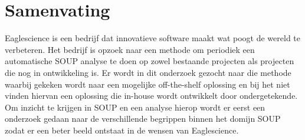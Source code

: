 


\begingroup
\let\clearpage\relax
\let\cleardoublepage\relax
\let\cleardoublepage\relax

\chapter*{Samenvating}
Eaglescience is een bedrijf dat innovatieve software maakt wat poogt de wereld te verbeteren. Het bedrijf is opzoek naar een methode om periodiek een automatische SOUP analyse te doen op zowel bestaande projecten als projecten die nog in ontwikkeling is. Er wordt in dit onderzoek gezocht naar die methode waarbij gekeken wordt naar een mogelijke off-the-shelf oplossing en bij het niet vinden hiervan een oplossing die in-house wordt ontwikkelt door ondergetekende. \\
Om inzicht te krijgen in SOUP en een analyse hierop wordt er eerst een onderzoek gedaan naar de verschillende begrippen binnen het domijn SOUP zodat er een beter beeld ontstaat in de wensen van Eaglescience. 

\endgroup			

\vfill